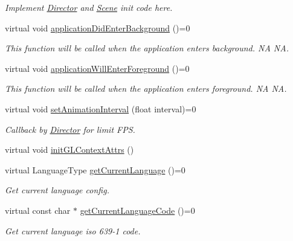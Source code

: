 \begin{DoxyCompactItemize}
\begin{DoxyCompactList}\small\item\em Implement \hyperlink{classDirector}{Director} and \hyperlink{classScene}{Scene} init code here. \end{DoxyCompactList}\item 
\mbox{\label{classApplicationProtocol_af155150f74e05460a3b815247cbe5cbc}} 
virtual void \hyperlink{classApplicationProtocol_af155150f74e05460a3b815247cbe5cbc}{application\+Did\+Enter\+Background} ()=0
\begin{DoxyCompactList}\small\item\em This function will be called when the application enters background.  NA  NA. \end{DoxyCompactList}\item 
\mbox{\label{classApplicationProtocol_ac17dbad28d975d778055bacacf2d8ca9}} 
virtual void \hyperlink{classApplicationProtocol_ac17dbad28d975d778055bacacf2d8ca9}{application\+Will\+Enter\+Foreground} ()=0
\begin{DoxyCompactList}\small\item\em This function will be called when the application enters foreground.  NA  NA. \end{DoxyCompactList}\item 
virtual void \hyperlink{classApplicationProtocol_ac69ac0f01aaba7cc8654ec7cce4eb88f}{set\+Animation\+Interval} (float interval)=0
\begin{DoxyCompactList}\small\item\em Callback by \hyperlink{classDirector}{Director} for limit F\+PS. \end{DoxyCompactList}\item 
virtual void \hyperlink{classApplicationProtocol_a4b83bcd1a065b1d745cbc3f358c45878}{init\+G\+L\+Context\+Attrs} ()
\item 
virtual Language\+Type \hyperlink{classApplicationProtocol_a44034ed02f9dd0fc59264f74f9ef9b17}{get\+Current\+Language} ()=0
\begin{DoxyCompactList}\small\item\em Get current language config. \end{DoxyCompactList}\item 
virtual const char $\ast$ \hyperlink{classApplicationProtocol_a4cb7a696dd51fee3ebb3075f0cca1455}{get\+Current\+Language\+Code} ()=0
\begin{DoxyCompactList}\small\item\em Get current language iso 639-\/1 code. \end{DoxyCompactList}\item 

\end{DoxyCompactItemize}

